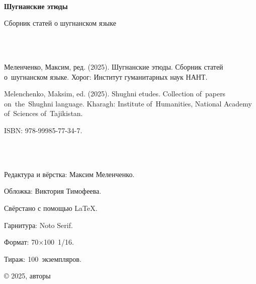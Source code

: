 \clearpage
\thispagestyle{empty}

{\setlength{\parindent}{0cm}

~\\
\smallskip

{\Large \textbf{Шугнанские этюды}

\smallskip
Сборник статей о шугнанском языке}

~\\ \medskip
~\\ \medskip

Меленченко, Максим, ред. (2025). Шугнанские этюды. Сборник статей о~шугнанском языке. Хорог: Институт гуманитарных наук НАНТ.

\smallskip

Melenchenko, Maksim, ed. (2025). Shughni etudes. Collection of~papers on~the~Shughni language. Kharagh: Institute of~Humanities, National Academy of~Sciences of~Tajikistan.

\smallskip

ISBN: 978-99985-77-34-7.

~\\ \medskip
~\\ \medskip

Редактура и вёрстка: Максим Меленченко.

Обложка: Виктория Тимофеева.

\bigskip

{\small
Свёрстано с помощью \LaTeX.

Гарнитура: Noto Serif.

Формат: 70×100~1/16.

Тираж: 100~экземпляров.
}

\vfill

© 2025, авторы

}